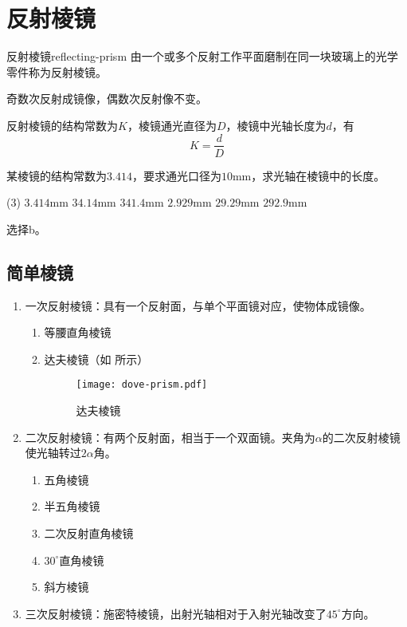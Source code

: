 \documentclass[cn,10pt,chinesefont=founder,math=newtx,cite=super,twoside]{elegantbook}
\begin{document}
\section{反射棱镜}
\label{sect:reflecting-prism}

\begin{definition}{反射棱镜}{reflecting-prism}
	由一个或多个反射工作平面磨制在同一块玻璃上的光学零件称为反射棱镜。
\end{definition}

\begin{property}
	奇数次反射成镜像，偶数次反射像不变。
\end{property}

反射棱镜的结构常数为$K$，棱镜通光直径为$D$，棱镜中光轴长度为$d$，有
\begin{equation}
K=\frac{d}{D}
\end{equation}

\begin{problem}
	某棱镜的结构常数为$3.414$，要求通光口径为$10\mathrm{mm}$，求光轴在棱镜中的长度。
	\begin{tasks}(3)
		\task $3.414\mathrm{mm}$
		\task $34.14\mathrm{mm}$
		\task $341.4\mathrm{mm}$
		\task $2.929\mathrm{mm}$
		\task $29.29\mathrm{mm}$
		\task $292.9\mathrm{mm}$
	\end{tasks}
\end{problem}
\begin{solution}
	选择b。
\end{solution}

\subsection{简单棱镜}

\begin{enumerate}
	\item 一次反射棱镜：具有一个反射面，与单个平面镜对应，使物体成镜像。
	\begin{enumerate}
		\item 等腰直角棱镜
		\item 达夫棱镜（如 所示）
		\begin{figure}[htbp]
			\centering
			\texttt{[image: dove-prism.pdf]}
			\caption{达夫棱镜}
			\label{fig:dove-prism}
		\end{figure}
	\end{enumerate}
	\item 二次反射棱镜：有两个反射面，相当于一个双面镜。夹角为$\alpha$的二次反射棱镜使光轴转过$2\alpha$角。
	\begin{enumerate}
		\item 五角棱镜
		\item 半五角棱镜
		\item 二次反射直角棱镜
		\item $30^{\circ}$直角棱镜
		\item 斜方棱镜
	\end{enumerate}
	\item 三次反射棱镜：施密特棱镜，出射光轴相对于入射光轴改变了$45^{\circ}$方向。
\end{enumerate}
\end{document}
